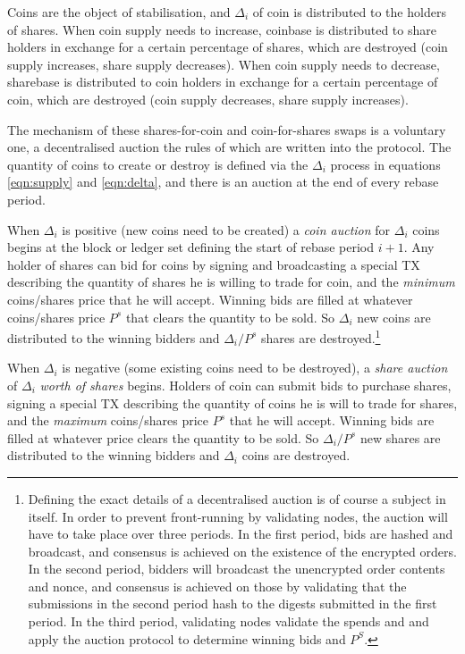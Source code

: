 \documentclass[twocolumn]{article}
\begin{document}
Coins are the object of stabilisation, and $\Delta_{i}$ of coin is
distributed to the holders of shares. When coin supply needs to
increase, coinbase is distributed to share holders in exchange for a
certain percentage of shares, which are destroyed (coin supply
increases, share supply decreases). When coin supply needs to
decrease, sharebase is distributed to coin holders in exchange for a
certain percentage of coin, which are destroyed (coin supply
decreases, share supply increases). 

The mechanism of these shares-for-coin and coin-for-shares swaps is a
voluntary one, a decentralised auction the rules of which are written
into the protocol. The quantity of coins to create or destroy is
defined via the $\Delta_{i}$ process in equations \ref{eqn:supply} and
\ref{eqn:delta}, and there is an auction at the end of every rebase
period. 

When $\Delta_{i}$ is positive (new coins need to be created) a
\emph{coin auction} for $\Delta_{i}$ coins begins at the block or
ledger set defining the start of rebase period $i+1$. Any holder of
shares can bid for coins by signing and broadcasting a special TX
describing the quantity of shares he is willing to trade for coin, and
the \emph{minimum} coins/shares price that he will accept. Winning
bids are filled at whatever coins/shares price $P^{s}$ that clears the
quantity to be sold. So $\Delta_{i}$ new coins are distributed to the
winning bidders and $\Delta_{i}/P^{s}$ shares are
destroyed.\footnote{Defining the exact details of a decentralised
  auction is of course a subject in itself. In order to prevent
  front-running by validating nodes, the auction will have to take
  place over three periods. In the first period, bids are hashed and
  broadcast, and consensus is achieved on the existence of the
  encrypted orders. In the second period, bidders will broadcast the
  unencrypted order contents and nonce, and consensus is achieved on
  those by validating that the submissions in the second period hash
  to the digests submitted in the first period. In the third period,
  validating nodes validate the spends and and apply the auction
  protocol to determine winning bids and $P^{S}$.}

When $\Delta_{i}$ is negative (some existing coins need to be
destroyed), a \emph{share auction} of $\Delta_{i}$ \emph{worth of
  shares} begins. Holders of coin can submit bids to purchase shares,
signing a special TX describing the quantity of coins he is will to
trade for shares, and the \emph{maximum} coins/shares price $P^{s}$
that he will accept. Winning bids are filled at whatever price clears
the quantity to be sold. So $\Delta_{i}/P^{s}$ new shares are
distributed to the winning bidders and $\Delta_{i}$ coins are
destroyed.
\end{document}
